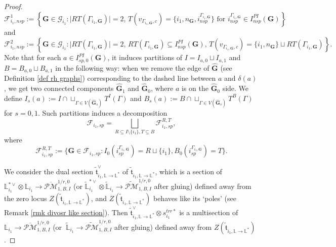 \documentclass[11pt]{amsart}
\theoremstyle{definition}
\theoremstyle{remark}
\newcommand{\oPMb}{{\overline{\mathcal{PM}}}}
\newcommand{\nontilde}{}
\newcommand{\<}{\left<}
\renewcommand{\>}{\right>}
\numberwithin{equation}{section}
\begin{document}
\begin{proof}
\begin{equation*}
            \bm{\mathcal F}^1_{i_1,nsp}:=\left\{ \bm{G}\in \bm{\mathcal G}_{i_1} \colon \text{$\lvert RT(\Gamma_{i_1,\bm{G}})\rvert=2$, $T(v_{\Gamma_{i_1,\bm{G}},c})=\{i_1,n_{\bm{G}},i^{\Gamma_{i_1,\bm{G}}}_{nsp}\}$ for $i^{\Gamma_{i_1,\bm{G}}}_{nsp}\in I^{PI}_{nsp}(\bm{G})$}\right \}
        \end{equation*}
        and 
        \begin{equation*}
            \bm{\mathcal F}^2_{i_1,nsp}:=\left\{ \bm{G}\in \bm{\mathcal G}_{i_1} \colon \text{$\lvert RT(\Gamma_{i_1,\bm{G}})\rvert=2$, $RT(\Gamma_{i_1,\bm{G}})\subseteq I^{PI}_{nsp}(\bm{G})$,  $T(v_{\Gamma_{i_1,\bm{G}},c})=\{i_1,n_{\bm{G}}\}\sqcup RT(\Gamma_{i_1,\bm{G}}) $}\right \}.
        \end{equation*}
        Note %
that for each $a\in I^{PI}_{sp,0}({\bm{G}})$, it induces  partitions of $I=I_{a,0}\sqcup I_{a,1}$ and $B=B_{a,0}\sqcup B_{a,1}$ in the following way:  when we remove the edge of $\hat{\bm{G}}$ (see Definition \ref{def rh graphs}) corresponding to the dashed line between $a$ and $\delta(a)$, we get two connected components $\hat{\bm{G}}_1$ and $\hat{\bm{G}}_0$, where $a$ is on the $\hat{\bm{G}}_0$ side. We define 
        $I_{s}(a):=I\cap \sqcup_{\Gamma\in V(\hat{\bm{G}}_s)} T^I(\Gamma)$ and $B_{s}(a):=B\cap \sqcup_{\Gamma\in V(\hat{\bm{G}}_s)} T^B(\Gamma)$ for $s=0,1$. Such partitions induces a decomposition 
        $$
        \bm{\mathcal F}_{i_1,sp}=\bigsqcup_{R\subseteq I\setminus\{i_1\}, T\subseteq B} \bm{\mathcal F}_{i_1,sp}^{R,T},
        $$
        where
        $$
       \bm{\mathcal F}_{i_1,sp}^{R,T}:=\{\bm{G} \in  \bm{\mathcal F}_{i_1,sp}\colon I_{0}(i_{sp}^{\Gamma_{i_1,\bm{G}}})=R\sqcup \{i_1\}, B_{0}(i_{sp}^{\Gamma_{i_1,\bm{G}}})=T \}.
        $$

        We consider the dual section $\tilde{\mathfrak{t}}^{\vee}_{i_1,\mathbb L \to \mathbb L^*}$ of $\tilde{\mathfrak{t}}_{i_1,\mathbb L \to \mathbb L^*}$, which is a section  of  ${\mathbb L}^{*\vee}_{i_1}\otimes {\mathbb L}_{i_1}\to  \oPMb^{1/r,0}_{1,B,I}$ (or $\widetilde{\mathbb L}^{*\vee}_{i_1}\otimes \widetilde{\mathbb L}_{i_1} \to \widetilde{\mathcal{PM}}^{1/r,0}_{1,B,I}$ after gluing) defined away from the zero locus $Z(\tilde{\mathfrak{t}}_{i_1,\mathbb L \to \mathbb L^*})$, and $Z(\tilde{\mathfrak{t}}_{i_1,\mathbb L \to \mathbb L^*})$ behaves like its `poles' (see Remark \ref{rmk divosr like section}). Then $\tilde{\mathfrak{t}}^{\vee}_{i_1,\mathbb L \to \mathbb L^*}\otimes
        \nontilde{s}^{trr*}_{i_1}$ is a multisection of  $ {\mathbb L}_{i_1}\to  \oPMb^{1/r,0}_{1,B,I}$ (or $\ \widetilde{\mathbb L}_{i_1} \to \widetilde{\mathcal{PM}}^{1/r,0}_{1,B,I}$ after gluing) defined away from $Z(\tilde{\mathfrak{t}}_{i_1,\mathbb L \to \mathbb L^*})$.


\end{proof}
\end{document}
